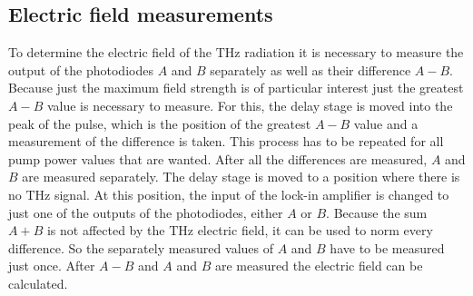 \subsection{Electric field measurements}
\label{sec:field}
To determine the electric field of the $\si{\tera\hertz}$ radiation it is necessary to measure the output of the photodiodes $A$ and $B$ separately as well as their difference $A-B$.
Because just the maximum field strength is of particular interest just the greatest $A-B$ value is necessary to measure.
For this, the delay stage is moved into the peak of the pulse, which is the position of the greatest $A-B$ value and a measurement of the difference is taken.
This process has to be repeated for all pump power values that are wanted.
After all the differences are measured, $A$ and $B$ are measured separately.
The delay stage is moved to a position where there is no $\si{\tera\hertz}$ signal.
At this position, the input of the lock-in amplifier is changed to just one of the outputs of the photodiodes, either $A$ or $B$.
Because the sum $A+B$ is not affected by the $\si{\tera\hertz}$ electric field, it can be used to norm every difference.
So the separately measured values of $A$ and $B$ have to be measured just once.
After $A-B$ and $A$ and $B$ are measured the electric field can be calculated.
